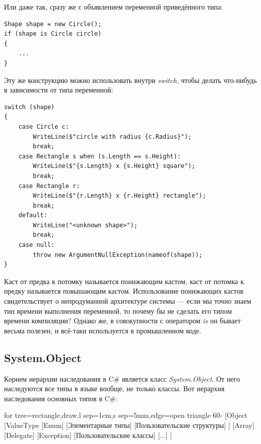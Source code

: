 \documentclass[a5paper]{article}
\begin{document}
Или даже так, сразу же с объявлением переменной приведённого типа:

\begin{verbatim}
Shape shape = new Circle();
if (shape is Circle circle) 
{
    ...
}
\end{verbatim}

Эту же конструкцию можно использовать внутри \textit{switch}, чтобы делать что-нибудь в зависимости от типа переменной:

\begin{verbatim}
switch (shape)
{
    case Circle c:
        WriteLine($"circle with radius {c.Radius}");
        break;
    case Rectangle s when (s.Length == s.Height):
        WriteLine($"{s.Length} x {s.Height} square");
        break;
    case Rectangle r:
        WriteLine($"{r.Length} x {r.Height} rectangle");
        break;
    default:
        WriteLine("<unknown shape>");
        break;
    case null:
        throw new ArgumentNullException(nameof(shape));
}
\end{verbatim}

Каст от предка к потомку называется понижающим кастом, каст от потомка к предку называется повышающим кастом. Использование понижающих кастов свидетельствует о непродуманной архитектуре системы --- если мы точно знаем тип времени выполнения переменной, то почему бы не сделать его типом времени компиляции? Однако же, в совокупности с оператором \textit{is} он бывает весьма полезен, и всё-таки используется в промышленном коде.

\subsection{System.Object}

Корнем иерархии наследования в C\# является класс \textit{System.Object}. От него наследуются все типы в языке вообще, не только классы. Вот иерархия наследования основных типов в C\#:

\begin{center}
	\begin{scriptsize}
		\begin{forest}
			for tree={rectangle,draw,l sep=1cm,s sep=5mm,edge=open triangle 60-}
			[Object
				[ValueType
					[Enum]
					[Элементарные типы]
					[Пользовательские структуры]
				]
				[Array]
				[Delegate]
				[Exception]
				[Пользовательские классы]
				[...]
			]
		\end{forest}
	\end{scriptsize}
\end{center}
\end{document}

